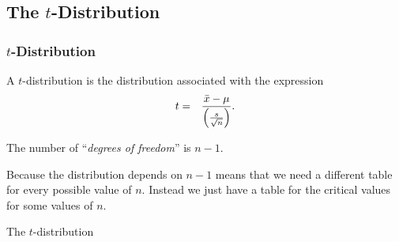 \subsection{The $t$-Distribution}


\begin{frame}
  \frametitle{$t$-Distribution}

  \begin{definition}[$t$-Distribution]

    A $t$-distribution is the distribution associated with the expression
    \begin{eqnarray*}
      t &  = & \frac{\bar{x}-\mu}{\left( \frac{s}{\sqrt{n}} \right)}.
    \end{eqnarray*}

    The number of ``\textit{degrees of freedom}'' is $n-1$.
    
  \end{definition}

  Because the distribution depends on $n-1$ means that we need a
  different table for every possible value of $n$. Instead we just
  have a table for the critical values for some values of $n$.
  

\end{frame}

\begin{frame}{The $t$-distribution}

  
\end{frame}


